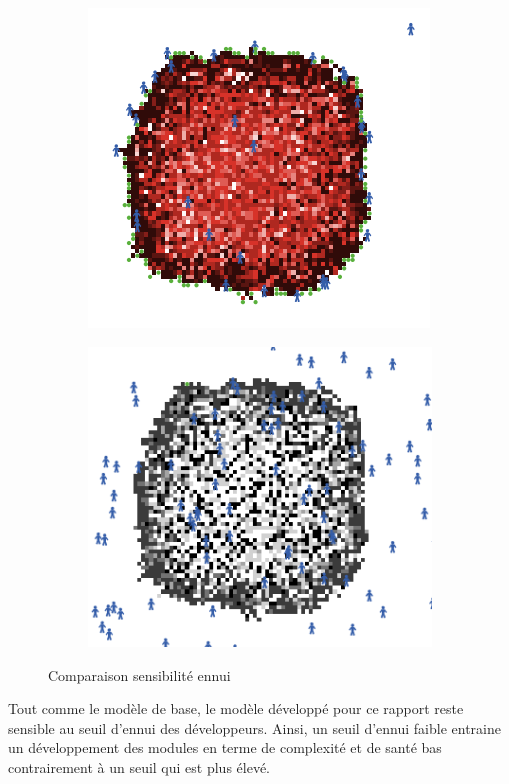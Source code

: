 \documentclass{article}
\begin{document}
\begin{figure}[H]
\begin{subfigure}{.5\textwidth}
    \includegraphics[width=.8\linewidth]{pictures/sensibilite_fort_ennui_complexite.png}
  \end{subfigure}
  \begin{subfigure}{.5\textwidth}
    \centering
    \includegraphics[width=.8\linewidth]{pictures/sensibilite_fort_ennui_sante.png}
  \end{subfigure}

  \caption{Comparaison sensibilité ennui}
\end{figure}
Tout comme le modèle de base, le modèle développé pour ce rapport reste sensible au seuil d'ennui des développeurs. Ainsi, un seuil d'ennui faible
entraine un développement des modules en terme de complexité et de santé bas contrairement à un seuil qui est plus élevé.
\end{document}
